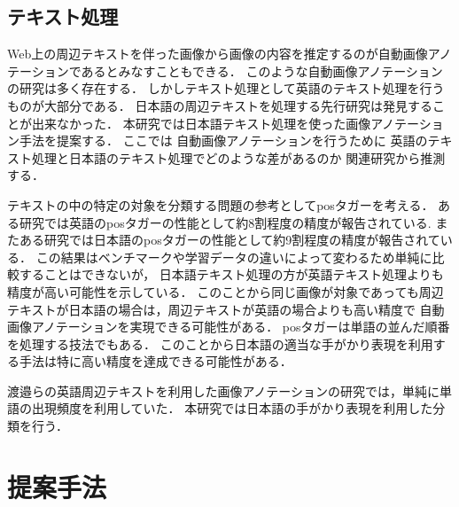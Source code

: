 \documentclass{deimj}
\begin{document}
\subsection{テキスト処理}

Web上の周辺テキストを伴った画像から画像の内容を推定するのが自動画像アノテーションであるとみなすこともできる．
このような自動画像アノテーションの研究は多く存在する．
しかしテキスト処理として英語のテキスト処理を行うものが大部分である．
日本語の周辺テキストを処理する先行研究は発見することが出来なかった．
本研究では日本語テキスト処理を使った画像アノテーション手法を提案する．
%
ここでは
自動画像アノテーションを行うために
英語のテキスト処理と日本語のテキスト処理でどのような差があるのか
関連研究から推測する．

テキストの中の特定の対象を分類する問題の参考としてposタガーを考える．
ある研究では英語のposタガーの性能として約8割程度の精度が報告されている\cite{BirdKleinLoper09}.
またある研究では日本語のposタガーの性能として約9割程度の精度が報告されている\cite{UniDicJp2010}．
この結果はベンチマークや学習データの違いによって変わるため単純に比較することはできないが，
日本語テキスト処理の方が英語テキスト処理よりも精度が高い可能性を示している．
このことから同じ画像が対象であっても周辺テキストが日本語の場合は，周辺テキストが英語の場合よりも高い精度で
自動画像アノテーションを実現できる可能性がある．
posタガーは単語の並んだ順番を処理する技法でもある．
このことから日本語の適当な手がかり表現を利用する手法は特に高い精度を達成できる可能性がある．

渡邉ら\cite{watanabe}の英語周辺テキストを利用した画像アノテーションの研究では，単純に単語の出現頻度を利用していた．
本研究では日本語の手がかり表現を利用した分類を行う．

\section{提案手法}
\label{sec:way}
\end{document}
